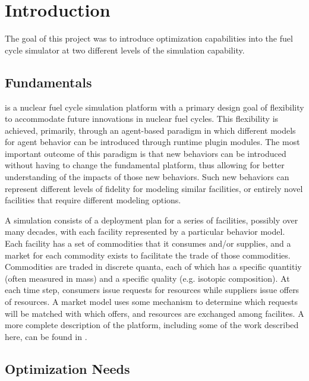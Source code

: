 \section{Introduction}

The goal of this project was to introduce optimization capabilities into the
\Cyclus{} fuel cycle simulator at two different levels of the simulation
capability.  

\subsection{\Cyclus{} Fundamentals}

\Cyclus{} is a nuclear fuel cycle simulation platform with a primary design
goal of flexibility to accommodate future innovations in nuclear fuel cycles.
This flexibility is achieved, primarily, through an agent-based paradigm in
which different models for agent behavior can be introduced through runtime
plugin modules.  The most important outcome of this paradigm is that new
behaviors can be introduced without having to change the fundamental platform,
thus allowing for better understanding of the impacts of those new behaviors.
Such new behaviors can represent different levels of fidelity for modeling
similar facilities, or entirely novel facilities that require different
modeling options.

A \Cyclus{} simulation consists of a deployment plan for a series of
facilities, possibly over many decades, with each facility represented by a
particular behavior model.  Each facility has a set of commodities that it
consumes and/or supplies, and a market for each commodity exists to facilitate
the trade of those commodities.  Commodities are traded in discrete quanta,
each of which has a specific quantitiy (often measured in mass) and a specific
quality (e.g. isotopic composition).  At each time step, consumers issue
requests for resources while suppliers issue offers of resources. A market
model uses some mechanism to determine which requests will be matched with
which offers, and resources are exchanged among facilites.  A more complete
description of the \Cyclus{} platform, including some of the work described
here, can be found in \cite{ref:cyclus_fundamentals}.

\subsection{Optimization Needs}

